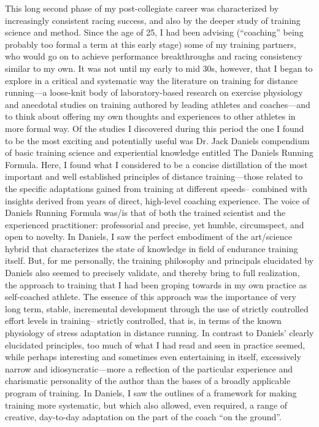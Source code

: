 This long second phase of my post-collegiate career was characterized by increasingly consistent racing success, and also by the deeper study of training science and method. Since the age of 25, I had been advising (“coaching” being probably too formal a term at this early stage) some of my training partners, who would go on to achieve performance breakthroughs and racing consistency similar to my own. It was not until my early to mid 30s, however, that I began to explore in a critical and systematic way the literature on training for distance running—a loose-knit body of laboratory-based research on exercise physiology and anecdotal studies on training authored by leading athletes and coaches—and to think about offering my own thoughts and experiences to other athletes in more formal way. Of the studies I discovered during this period the one I found to be the most exciting and potentially useful was Dr. Jack Daniels compendium of basic training science and experiential knowledge entitled The Daniels Running Formula. Here, I found what I considered to be a concise distillation of the most important and well established principles of distance training—those related to the specific adaptations gained from training at different speeds-- combined with insights derived from years of direct, high-level coaching experience. The voice of Daniels Running Formula was/is that of both the trained scientist and the experienced practitioner: professorial and precise, yet humble, circumspect, and open to novelty. In Daniels, I saw the perfect embodiment of the art/science hybrid that characterizes the state of knowledge in field of endurance training itself. But, for me personally, the training philosophy and principals elucidated by Daniels also seemed to precisely validate, and thereby bring to full realization, the approach to training that I had been groping towards in my own practice as self-coached athlete. The essence of this approach was the importance of very long term, stable, incremental development through the use of strictly controlled effort levels in training-- strictly controlled, that is, in terms of the known physiology of stress adaptation in distance running. In contrast to Daniels’ clearly elucidated principles, too much of what I had read and seen in practice seemed, while perhaps interesting and sometimes even entertaining in itself, excessively narrow and idiosyncratic—more a reflection of the particular experience and charismatic personality of the author than the bases of a broadly applicable program of training. In Daniels, I saw the outlines of a framework for making training more systematic, but which also allowed, even required, a range of creative, day-to-day adaptation on the part of the coach “on the ground”.

